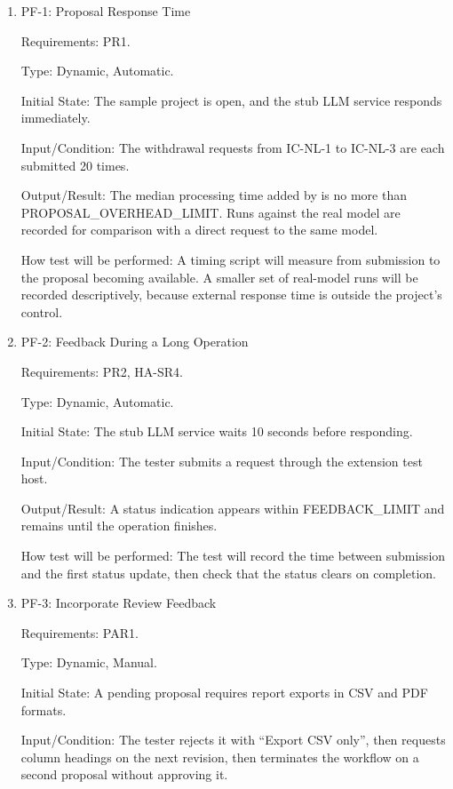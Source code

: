 \documentclass[12pt, titlepage]{article}
\begin{document}
\begin{enumerate}

\item{PF-1: Proposal Response Time\\}

Requirements: PR1.

Type: Dynamic, Automatic.

Initial State: The sample project is open, and the stub LLM service responds
immediately.

Input/Condition: The withdrawal requests from IC-NL-1 to IC-NL-3 are each
submitted 20 times.

Output/Result: The median processing time added by \progname{} is no more than
PROPOSAL\_OVERHEAD\_LIMIT. Runs against the real model are recorded for
comparison with a direct request to the same model.

How test will be performed: A timing script will measure from submission to the
proposal becoming available. A smaller set of real-model runs will be recorded
descriptively, because external response time is outside the project's control.

\item{PF-2: Feedback During a Long Operation\\}

Requirements: PR2, HA-SR4.

Type: Dynamic, Automatic.

Initial State: The stub LLM service waits 10 seconds before responding.

Input/Condition: The tester submits a request through the extension test host.

Output/Result: A status indication appears within FEEDBACK\_LIMIT and remains
until the operation finishes.

How test will be performed: The test will record the time between submission and
the first status update, then check that the status clears on completion.

\item{PF-3: Incorporate Review Feedback\\}

Requirements: PAR1.

Type: Dynamic, Manual.

Initial State: A pending proposal requires report exports in CSV and PDF formats.

Input/Condition: The tester rejects it with ``Export CSV only'', then requests
column headings on the next revision, then terminates the workflow on a second
proposal without approving it.


\end{enumerate}
\end{document}
